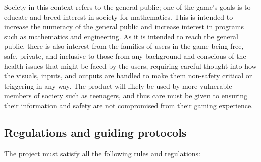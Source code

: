 \documentclass[12pt]{article}
\begin{document}
\begin{itemize}
      Society in this context refers to the general public; one of the game's goals is to educate and breed interest in society for mathematics. This is intended to increase the numeracy of the general public and increase interest in programs such as mathematics and engineering.
      As it is intended to reach the general public, there is also interest from the families of users in the game being free, safe, private, and inclusive to those from any background and conscious of the health issues that might be faced by the users,
      requiring careful thought into how the visuals, inputs, and outputs are handled to make them non-safety critical or triggering in any way. The product will likely be used by more vulnerable members of society such as teenagers, and thus care must be given to ensuring their 
      information and safety are not compromised from their gaming experience.
\end{itemize}


\subsection{Regulations and guiding protocols}
The project must satisfy all the following rules and regulations: 
\end{document}
